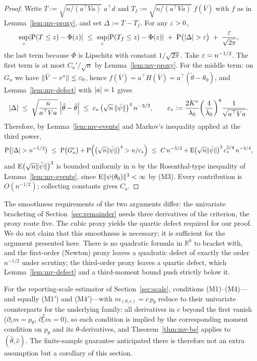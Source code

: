 \begin{proof}
Write $T:=\sqrt{n/(a^{\top}Va)}\;a^{\top}d$ and $T_{f}:=\sqrt{n/(a^{\top}Va)}\;f(\bar V)$ with $f$ as in Lemma~\ref{lem:mv-proxy}, and set $\Delta:=T-T_{f}$. For any $\varepsilon>0$,
\[
\sup_{z}\abs*{\Prob(T\le z)-\Phi(z)}\ \le\ \sup_{z}\abs*{\Prob(T_{f}\le z)-\Phi(z)}\;+\;\Prob\big(\abs{\Delta}>\eps\big)\;+\;\frac{\eps}{\sqrt{2\pi}},
\]
the last term because $\Phi$ is Lipschitz with constant $1/\sqrt{2\pi}$. Take $\varepsilon=n^{-1/2}$. The first term is at most $C_{a}'/\sqrt{n}$ by Lemma~\ref{lem:mv-proxy}. For the middle term: on $G_{n}$ we have $\lVert\bar V-v^{*}\rVert\le\varepsilon_{0}$, hence $f(\bar V)=a^{\top}H(\bar V)=a^{\top}(\tilde\theta-\theta_{0})$, and Lemma~\ref{lem:mv-defect} with $\lvert a\rvert=1$ gives
\[
\abs{\Delta}\;\le\;\sqrt{\frac{n}{a^{\top}Va}}\;\abs*{\hat\theta-\tilde\theta}\;\le\;c_{*}\,\big(\sqrt{n}\,\norm{\bar\psi}\big)^{4}\,n^{-3/2},
\qquad
c_{*}:=\frac{2K^{*}}{\lambda_{0}}\paren*{\frac{4}{\lambda_{0}}}^{4}\frac{1}{\sqrt{a^{\top}Va}} .
\]
Therefore, by Lemma~\ref{lem:mv-events} and Markov's inequality applied at the third power,
\[
\Prob\big(\abs{\Delta}>n^{-1/2}\big)\ \le\ \Prob\big(G_{n}^{\mathrm{c}}\big)+\Prob\Big(\big(\sqrt{n}\norm{\bar\psi}\big)^{4}>n/c_{*}\Big)
\ \le\ C\,n^{-3/2}+\E\big(\sqrt{n}\norm{\bar\psi}\big)^{3}\,c_{*}^{3/4}\,n^{-3/4},
\]
and $\mathrm{E}\big(\sqrt{n}\lVert\bar\psi\rVert\big)^{3}$ is bounded uniformly in $n$ by the Rosenthal-type inequality of Lemma~\ref{lem:mv-events}, since $\mathrm{E}\lVert\psi(\theta_{0})\rVert^{3}<\infty$ by (M3). Every contribution is $O(n^{-1/2})$; collecting constants gives $C_{a}$.
\end{proof}

\begin{remark}
The smoothness requirements of the two arguments differ: the univariate bracketing of Section~\ref{sec:remainder} needs three derivatives of the criterion, the proxy route five. The cubic proxy yields the quartic defect required for our proof. We do not claim that this smoothness is necessary; it is sufficient for the argument presented here. There is no quadratic formula in $\mathbb{R}^{k}$ to bracket with, and the first-order (Newton) proxy leaves a quadratic defect of exactly the order $n^{-1/2}$ under scrutiny; the third-order proxy leaves a quartic defect, which Lemma~\ref{lem:mv-defect} and a third-moment bound push strictly below it.
\end{remark}

For the reporting-scale estimator of Section~\ref{sec:scale}, conditions (M1)--(M4)---and equally (M1$'$) and (M4$'$)---with $m_{(\theta,c)}=c\,p_{\theta}$ reduce to their univariate counterparts for the underlying family: all derivatives in $c$ beyond the first vanish ($\partial_{c}m=p_{\theta}$, $\partial_{c}^{2}m=0$), so each condition is implied by the corresponding moment condition on $p_{\theta}$ and its $\theta$-derivatives, and Theorem~\ref{thm:mv-be} applies to $(\hat\theta,\hat c)$. The finite-sample guarantee anticipated there is therefore not an extra assumption but a corollary of this section.

